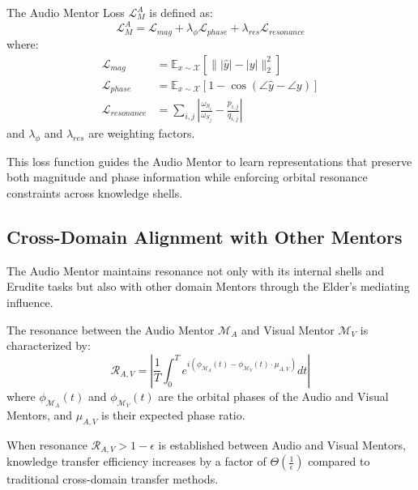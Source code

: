 \begin{definition}
The Audio Mentor Loss $\mathcal{L}_M^A$ is defined as:
\begin{equation}
\mathcal{L}_M^A = \mathcal{L}_{mag} + \lambda_{\phi} \mathcal{L}_{phase} + \lambda_{res} \mathcal{L}_{resonance}
\end{equation}
where:
\begin{align}
\mathcal{L}_{mag} &= \mathbb{E}_{x \sim \mathcal{X}} \left[ \| |\hat{y}| - |y| \|_2^2 \right] \\
\mathcal{L}_{phase} &= \mathbb{E}_{x \sim \mathcal{X}} \left[ 1 - \cos(\angle\hat{y} - \angle y) \right] \\
\mathcal{L}_{resonance} &= \sum_{i,j} \left| \frac{\omega_{S_i}}{\omega_{S_j}} - \frac{p_{i,j}}{q_{i,j}} \right|
\end{align}
and $\lambda_{\phi}$ and $\lambda_{res}$ are weighting factors.
\end{definition}

This loss function guides the Audio Mentor to learn representations that preserve both magnitude and phase information while enforcing orbital resonance constraints across knowledge shells.

\subsection{Cross-Domain Alignment with Other Mentors}

The Audio Mentor maintains resonance not only with its internal shells and Erudite tasks but also with other domain Mentors through the Elder's mediating influence.

\begin{definition}
The resonance between the Audio Mentor $\mathcal{M}_A$ and Visual Mentor $\mathcal{M}_V$ is characterized by:
\begin{equation}
\mathcal{R}_{A,V} = \left| \frac{1}{T} \int_0^T e^{i(\phi_{\mathcal{M}_A}(t) - \phi_{\mathcal{M}_V}(t) \cdot \mu_{A,V})} dt \right|
\end{equation}
where $\phi_{\mathcal{M}_A}(t)$ and $\phi_{\mathcal{M}_V}(t)$ are the orbital phases of the Audio and Visual Mentors, and $\mu_{A,V}$ is their expected phase ratio.
\end{definition}

\begin{theorem}
When resonance $\mathcal{R}_{A,V} > 1-\epsilon$ is established between Audio and Visual Mentors, knowledge transfer efficiency increases by a factor of $\Theta(\frac{1}{\epsilon})$ compared to traditional cross-domain transfer methods.
\end{theorem}

